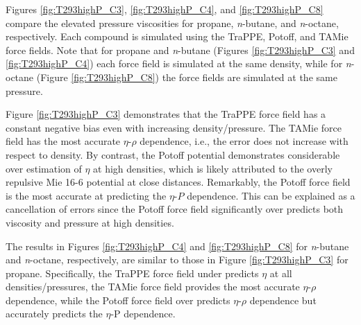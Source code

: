 \documentclass[preprint,review,12pt]{elsarticle}
\begin{document}
	Figures \ref{fig:T293highP_C3}, \ref{fig:T293highP_C4}, and \ref{fig:T293highP_C8} compare the elevated pressure viscosities for propane, \textit{n}-butane, and \textit{n}-octane, respectively. Each compound is simulated using the TraPPE, Potoff, and TAMie force fields. Note that for propane and \textit{n}-butane (Figures \ref{fig:T293highP_C3} and \ref{fig:T293highP_C4}) each force field is simulated at the same density, while for \textit{n}-octane (Figure \ref{fig:T293highP_C8}) the force fields are simulated at the same pressure. 
	
	
	Figure \ref{fig:T293highP_C3} demonstrates that the TraPPE force field has a constant negative bias even with increasing density/pressure. The TAMie force field has the most accurate $\eta$-$\rho$ dependence, i.e., the error does not increase with respect to density. By contrast, the Potoff potential demonstrates considerable over estimation of $\eta$ at high densities, which is likely attributed to the overly repulsive Mie 16-6 potential at close distances. Remarkably, the Potoff force field is the most accurate at predicting the $\eta$-$P$ dependence. This can be explained as a cancellation of errors since the Potoff force field significantly over predicts both viscosity and pressure at high densities. 
	
	The results in Figures \ref{fig:T293highP_C4} and \ref{fig:T293highP_C8} for \textit{n}-butane and \textit{n}-octane, respectively, are similar to those in Figure \ref{fig:T293highP_C3} for propane. Specifically, the TraPPE force field under predicts $\eta$ at all densities/pressures, the TAMie force field provides the most accurate $\eta$-$\rho$ dependence, while the Potoff force field over predicts $\eta$-$\rho$ dependence but accurately predicts the $\eta$-P dependence.  
	
\end{document}
